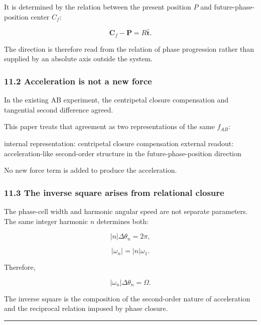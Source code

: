 \documentclass[
  10pt,
  a4paper,
]{article}
\newenvironment{Shaded}{}{}
\newcommand{\NormalTok}[1]{#1}
\begin{document}
It is determined by the relation between the present position \(P\) and
future-phase-position center \(C_f\):

\[
\boldsymbol C_f-\boldsymbol P
=R\hat{\boldsymbol t}.
\]

The direction is therefore read from the relation of phase progression
rather than supplied by an absolute axis outside the system.

\subsubsection{11.2 Acceleration is not a new
force}\label{acceleration-is-not-a-new-force}

In the existing AB experiment, the centripetal closure compensation and
tangential second difference agreed.

This paper treats that agreement as two representations of the same
\(f_{AB}\):

\begin{Shaded}
\begin{Highlighting}[]
\NormalTok{internal representation: centripetal closure compensation}
\NormalTok{external readout: acceleration{-}like second{-}order structure in the future{-}phase{-}position direction}
\end{Highlighting}
\end{Shaded}

No new force term is added to produce the acceleration.

\subsubsection{11.3 The inverse square arises from relational
closure}\label{the-inverse-square-arises-from-relational-closure}

The phase-cell width and harmonic angular speed are not separate
parameters. The same integer harmonic \(n\) determines both:

\[
|n|\Delta\theta_n=2\pi,
\]

\[
|\omega_n|=|n|\omega_1.
\]

Therefore,

\[
|\omega_n|\Delta\theta_n=\Omega.
\]

The inverse square is the composition of the second-order nature of
acceleration and the reciprocal relation imposed by phase closure.

\begin{center}\rule{0.5\linewidth}{0.5pt}\end{center}
\end{document}
